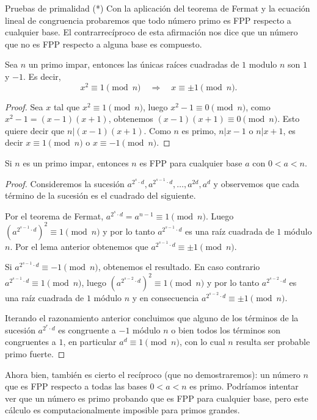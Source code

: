 \begin{section}{Pruebas de primalidad (*)}
Con la aplicación del teorema de Fermat y la ecuación lineal de congruencia probaremos  que todo número primo es FPP respecto a cualquier base. El contrarrecíproco de esta afirmación nos dice que un número que no es FPP respecto a alguna base es compuesto.

\begin{lema}
    Sea $n$  un primo impar, entonces las únicas raíces cuadradas de $1$ modulo $n$ son $1$ y $-1$. Es decir, 
    $$
    x^2 \equiv 1 \pmod{n}  \quad \Rightarrow\quad x \equiv \pm 1 \pmod{n}.
    $$
\end{lema}
\begin{proof}
    Sea $x$ tal que $x^2 \equiv 1 \pmod{n}$, luego $x^2 - 1 \equiv 0 \pmod{n}$, como $x^2 -1 = (x-1)(x+1)$, obtenemos  $(x-1)(x+1) \equiv 0 \pmod{n}$. Esto quiere decir  que $n|  (x-1)(x+1)$. Como $n$  es primo, $n | x -1$ o $n| x +1$, es decir $x  \equiv 1 \pmod{n}$  o $x  \equiv -1 \pmod{n}$.
\end{proof}

\begin{teorema}
    Si $n$ es un primo impar, entonces $n$ es FPP para cualquier base  $a$ con $0 < a < n$.
\end{teorema}
\begin{proof}
    Consideremos la sucesión $a^{2^s \cdot d}, a^{2^{s-1} \cdot d}, \dots, a^{2d}, a^d$ y  observemos que cada término de la sucesión es el cuadrado del siguiente.

     Por el teorema de Fermat,  $a^{2^s \cdot d} = a^{n-1} \equiv 1 \pmod{n}$. Luego $(a^{2^{s-1} \cdot d})^2 \equiv 1 \pmod{n}$ y por lo tanto $a^{2^{s-1} \cdot d}$ es una raíz cuadrada de $1$ módulo $n$. Por el lema anterior obtenemos  que  $a^{2^{s-1} \cdot d} \equiv \pm 1 \pmod{n}$.

     Si  $a^{2^{s-1} \cdot d} \equiv - 1 \pmod{n}$, obtenemos el resultado.  En caso contrario  $a^{2^{s-1} \cdot d} \equiv 1 \pmod{n}$,  luego $(a^{2^{s-2} \cdot d})^2 \equiv 1 \pmod{n}$ y por lo tanto $a^{2^{s-2} \cdot d}$ es una raíz cuadrada de $1$ módulo $n$ y en consecuencia  $a^{2^{s-2} \cdot d} \equiv \pm 1 \pmod{n}$. 

     Iterando el razonamiento anterior concluimos que alguno de los términos de la sucesión $ a^{2^{r} \cdot d}$  es congruente   a $-1$ módulo $n$ o bien todos los términos son congruentes a $1$,  en particular $a^{d} \equiv 1 \pmod{n}$, con lo cual $n$ resulta ser probable primo fuerte.   
\end{proof}


Ahora bien, también es cierto el recíproco (que no demostraremos): un número $n$ que es FPP respecto a todas las bases $ 0 < a < n$ es primo. Podríamos intentar ver que un número es primo  probando que es FPP para cualquier base, pero este cálculo es computacionalmente imposible para primos grandes.  


\end{section}
